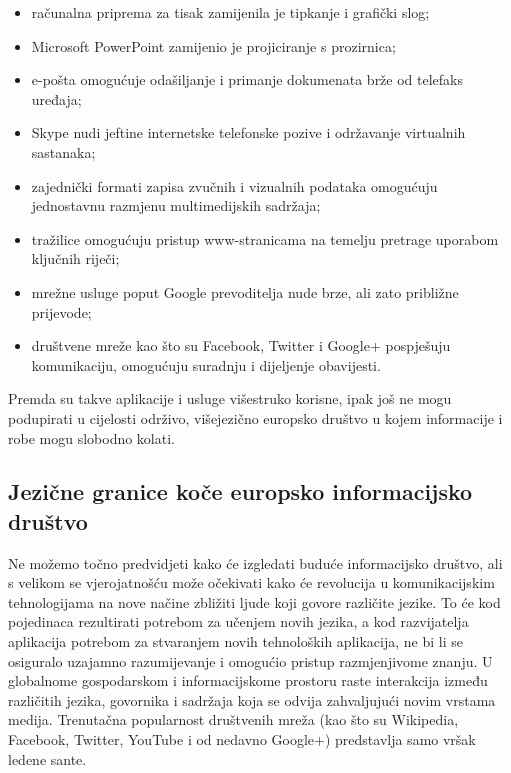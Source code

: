 \begin{multicols}{2}
\begin{itemize}
\item računalna priprema za tisak zamijenila je tipkanje i grafički slog;
\item Microsoft PowerPoint zamijenio je projiciranje s prozirnica;
\item e-pošta omogućuje odašiljanje i primanje dokumenata brže od telefaks uređaja;
\item Skype nudi jeftine internetske telefonske pozive i održavanje virtualnih sastanaka;
\item zajednički formati zapisa zvučnih i vizualnih podataka omogućuju jednostavnu razmjenu multimedijskih sadržaja;
\item tražilice omogućuju pristup www-stranicama na temelju pretrage uporabom ključnih riječi;
\item mrežne usluge poput Google prevoditelja nude brze, ali zato približne prijevode;
\item društvene mreže kao što su Facebook, Twitter i Google+ pospješuju komunikaciju, omogućuju suradnju i dijeljenje obavijesti.
\end{itemize}

Premda su takve aplikacije i usluge višestruko korisne, ipak još ne mogu podupirati u cijelosti održivo, višejezično europsko društvo u kojem informacije i robe mogu slobodno kolati.

\subsection{Jezične granice koče europsko informacijsko društvo}
  
Ne možemo točno predvidjeti kako će izgledati buduće informacijsko društvo, ali s velikom se vjerojatnošću može očekivati kako će revolucija u komunikacijskim tehnologijama na nove načine zbližiti ljude koji govore različite jezike. To će kod pojedinaca rezultirati potrebom za učenjem novih jezika, a kod razvijatelja aplikacija potrebom za stvaranjem novih tehnoloških aplikacija, ne bi li se osiguralo uzajamno razumijevanje i omogućio pristup razmjenjivome znanju. U globalnome gospodarskom i informacijskome prostoru raste interakcija između različitih jezika, govornika i sadržaja koja se odvija zahvaljujući novim vrstama medija. Trenutačna popularnost društvenih mreža (kao što su Wikipedia, Facebook, Twitter, YouTube i od nedavno Google+) predstavlja samo vršak ledene sante. 



\end{multicols}
